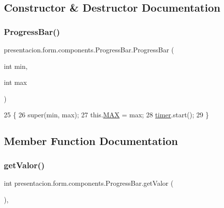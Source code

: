 \subsection{Constructor \& Destructor Documentation}
\mbox{\label{classpresentacion_1_1form_1_1components_1_1ProgressBar_a1deb4ce0d79cfafe36be10ff9087b392}} 
\subsubsection{\texorpdfstring{Progress\+Bar()}{ProgressBar()}}
{\footnotesize\ttfamily presentacion.\+form.\+components.\+Progress\+Bar.\+Progress\+Bar (\begin{DoxyParamCaption}\item[{int}]{min,  }\item[{int}]{max }\end{DoxyParamCaption})\hspace{0.3cm}{\ttfamily [inline]}}


\begin{DoxyCode}
25     \{
26         super(min, max);
27         this.\hyperlink{classpresentacion_1_1form_1_1components_1_1ProgressBar_a3f6a2544b74d1b12812202c794bd0495}{MAX} = max;
28         \hyperlink{classpresentacion_1_1form_1_1components_1_1ProgressBar_a6be2ec470ec1683c37b1d6c44c3981ca}{timer}.start();
29     \}
\end{DoxyCode}


\subsection{Member Function Documentation}
\mbox{\label{classpresentacion_1_1form_1_1components_1_1ProgressBar_ad4a771a1e071efde0956a8984ad91eb1}} 
\subsubsection{\texorpdfstring{get\+Valor()}{getValor()}}
{\footnotesize\ttfamily int presentacion.\+form.\+components.\+Progress\+Bar.\+get\+Valor (\begin{DoxyParamCaption}{ }\end{DoxyParamCaption})\hspace{0.3cm}{\ttfamily [inline]}, {\ttfamily [private]}}


